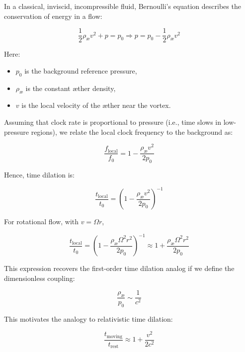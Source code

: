 In a classical, inviscid, incompressible fluid, Bernoulli's equation describes the conservation of energy in a flow:

\begin{equation}
    \frac{1}{2} \rho_{\text{\ae}}  v^2 + p = p_0 \Rightarrow p = p_0 - \frac{1}{2} \rho_{\text{\ae}} v^2\label{eq:bernoulli}
\end{equation}

Here:
\begin{itemize}
    \item $p_0$ is the background reference pressure,
    \item $\rho_{\text{\ae}}$ is the constant æther density,
    \item $v$ is the local velocity of the æther near the vortex.
\end{itemize}

Assuming that clock rate is proportional to pressure (i.e., time slows in low-pressure regions), we relate the local clock frequency to the background as:

\begin{equation}
    \frac{f_{\text{local}}}{f_0} = 1 - \frac{\rho_{\text{\ae}} v^2}{2 p_0}\label{eq:local_clock_frequency}
\end{equation}

Hence, time dilation is:

\begin{equation}
    \frac{t_{\text{local}}}{t_0} = \left(1 - \frac{\rho_{\text{\ae}} v^2}{2 p_0}\right)^{-1}\label{eq:time_dilation}
\end{equation}

For rotational flow, with $v = \Omega r$,

\begin{equation}
    \frac{t_{\text{local}}}{t_0} = \left(1 - \frac{\rho_{\text{\ae}} \Omega^2 r^2}{2 p_0} \right)^{-1} \approx 1 + \frac{\rho_{\text{\ae}}\Omega^2 r^2}{2 p_0}\label{eq:time_dilation_rotational}
\end{equation}

This expression recovers the first-order time dilation analog if we define the dimensionless coupling:

\begin{equation}
    \frac{\rho_{\text{\ae}}}{p_0} \sim \frac{1}{c^2}\label{eq:dimensionless_coupling}
\end{equation}

This motivates the analogy to relativistic time dilation:

\begin{equation}
    \frac{t_{\text{moving}}}{t_\text{rest}} \approx 1 + \frac{v^2}{2 c^2}\label{eq:relativistic_time_dilation}
\end{equation}

